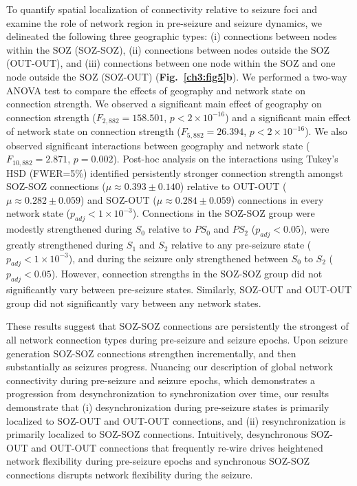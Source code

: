 To quantify spatial localization of connectivity relative to seizure foci and examine the role of network region in pre-seizure and seizure dynamics, we delineated the following three geographic types: (i) connections between nodes within the SOZ (SOZ-SOZ), (ii) connections between nodes outside the SOZ (OUT-OUT), and (iii) connections between one node within the SOZ and one node outside the SOZ (SOZ-OUT) (\textbf{Fig.~\ref{ch3:fig5}b}). We performed a two-way ANOVA test to compare the effects of geography and network state on connection strength. We observed a significant main effect of geography on connection strength ($F_{2,882}=158.501$, $p<2\times10^{-16}$) and a significant main effect of network state on connection strength ($F_{5,882}=26.394$, $p<2\times10^{-16}$). We also observed significant interactions between geography and network state ($F_{10,882}=2.871$, $p=0.002$). Post-hoc analysis on the interactions using Tukey's HSD (FWER=5\%) identified persistently stronger connection strength amongst SOZ-SOZ connections ($\mu\approx0.393\pm0.140$) relative to OUT-OUT ($\mu\approx0.282\pm0.059$) and SOZ-OUT ($\mu\approx0.284\pm0.059$) connections in every network state ($p_{adj}<1\times10^{-3}$). Connections in the SOZ-SOZ group were modestly strengthened during $S_0$ relative to $PS_0$ and $PS_2$ ($p_{adj}<0.05$), were greatly strengthened during $S_1$ and $S_2$ relative to any pre-seizure state ($p_{adj}<1\times10^{-3}$), and during the seizure only strengthened between $S_0$ to $S_2$ ($p_{adj}<0.05$). However, connection strengths in the SOZ-SOZ group did not significantly vary between pre-seizure states. Similarly, SOZ-OUT and OUT-OUT group did not significantly vary between any network states.

These results suggest that SOZ-SOZ connections are persistently the strongest of all network connection types during pre-seizure and seizure epochs. Upon seizure generation SOZ-SOZ connections strengthen incrementally, and then substantially as seizures progress. Nuancing our description of global network connectivity during pre-seizure and seizure epochs, which demonstrates a progression from desynchronization to synchronization over time, our results demonstrate that (i) desynchronization during pre-seizure states is primarily localized to SOZ-OUT and OUT-OUT connections, and (ii) resynchronization is primarily localized to SOZ-SOZ connections. Intuitively, desynchronous SOZ-OUT and OUT-OUT connections that frequently re-wire drives heightened network flexibility during pre-seizure epochs and synchronous SOZ-SOZ connections disrupts network flexibility during the seizure. 

